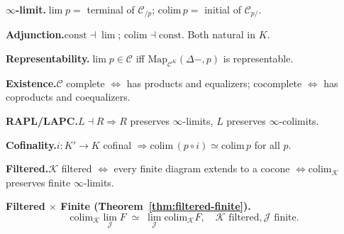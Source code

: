 \begin{formalrestatement}
\textbf{$\infty$-limit.}\quad $\lim p =$ terminal of $\mathcal{C}_{/p}$;
$\mathrm{colim}\, p =$ initial of $\mathcal{C}_{p/}$.

\medskip
\textbf{Adjunction.}\quad $\mathrm{const} \dashv \lim$;
$\mathrm{colim} \dashv \mathrm{const}$. Both natural in $K$.

\medskip
\textbf{Representability.}\quad $\lim p \in \mathcal{C}$ iff
$\mathrm{Map}_{\mathcal{C}^K}(\Delta -, p)$ is representable.

\medskip
\textbf{Existence.}\quad $\mathcal{C}$ complete $\iff$ has products and
equalizers; cocomplete $\iff$ has coproducts and coequalizers.

\medskip
\textbf{RAPL/LAPC.}\quad $L \dashv R \Rightarrow R$ preserves $\infty$-limits,
$L$ preserves $\infty$-colimits.

\medskip
\textbf{Cofinality.}\quad $i : K' \to K$ cofinal $\Rightarrow
\mathrm{colim}\,(p \circ i) \simeq \mathrm{colim}\, p$ for all $p$.

\medskip
\textbf{Filtered.}\quad $\mathcal{K}$ filtered $\iff$ every finite diagram
extends to a cocone $\iff \mathrm{colim}_\mathcal{K}$ preserves finite
$\infty$-limits.

\medskip
\textbf{Filtered $\times$ Finite (Theorem~\ref{thm:filtered-finite}).}\quad
\begin{equation*}
  \mathrm{colim}_\mathcal{K} \lim_\mathcal{J} F \;\simeq\;
  \lim_\mathcal{J} \mathrm{colim}_\mathcal{K} F,
  \quad \mathcal{K} \text{ filtered}, \mathcal{J} \text{ finite}.
\end{equation*}
\end{formalrestatement}
